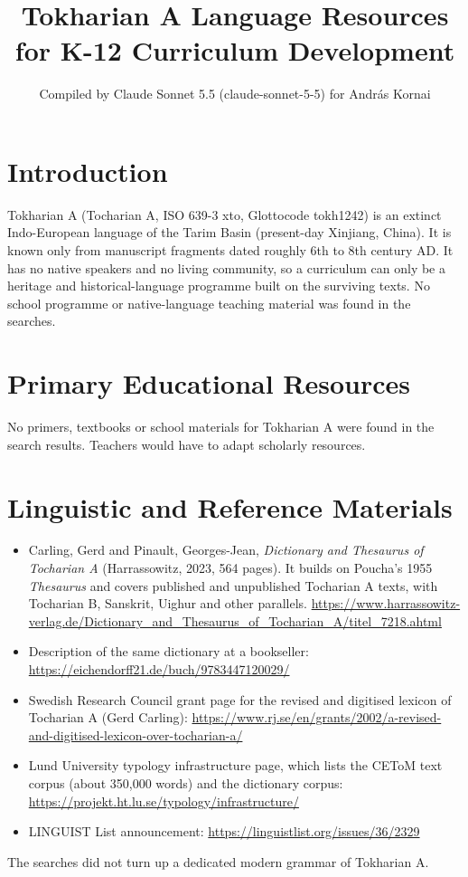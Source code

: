 \documentclass[12pt]{article}
\title{Tokharian A Language Resources for K-12 Curriculum Development}
\author{Compiled by Claude Sonnet 5.5 (claude-sonnet-5-5) for Andr\'as Kornai}
\date{}
\begin{document}
\maketitle

\section{Introduction}
Tokharian A (Tocharian A, ISO 639-3 xto, Glottocode tokh1242) is an extinct Indo-European language of the Tarim Basin (present-day Xinjiang, China). It is known only from manuscript fragments dated roughly 6th to 8th century AD. It has no native speakers and no living community, so a curriculum can only be a heritage and historical-language programme built on the surviving texts. No school programme or native-language teaching material was found in the searches.

\section{Primary Educational Resources}
No primers, textbooks or school materials for Tokharian A were found in the search results. Teachers would have to adapt scholarly resources.

\section{Linguistic and Reference Materials}
\begin{itemize}
\item Carling, Gerd and Pinault, Georges-Jean, \emph{Dictionary and Thesaurus of Tocharian A} (Harrassowitz, 2023, 564 pages). It builds on Poucha's 1955 \emph{Thesaurus} and covers published and unpublished Tocharian A texts, with Tocharian B, Sanskrit, Uighur and other parallels. \url{https://www.harrassowitz-verlag.de/Dictionary_and_Thesaurus_of_Tocharian_A/titel_7218.ahtml}
\item Description of the same dictionary at a bookseller: \url{https://eichendorff21.de/buch/9783447120029/}
\item Swedish Research Council grant page for the revised and digitised lexicon of Tocharian A (Gerd Carling): \url{https://www.rj.se/en/grants/2002/a-revised-and-digitised-lexicon-over-tocharian-a/}
\item Lund University typology infrastructure page, which lists the CEToM text corpus (about 350,000 words) and the dictionary corpus: \url{https://projekt.ht.lu.se/typology/infrastructure/}
\item LINGUIST List announcement: \url{https://linguistlist.org/issues/36/2329}
\end{itemize}
The searches did not turn up a dedicated modern grammar of Tokharian A.
\end{document}
